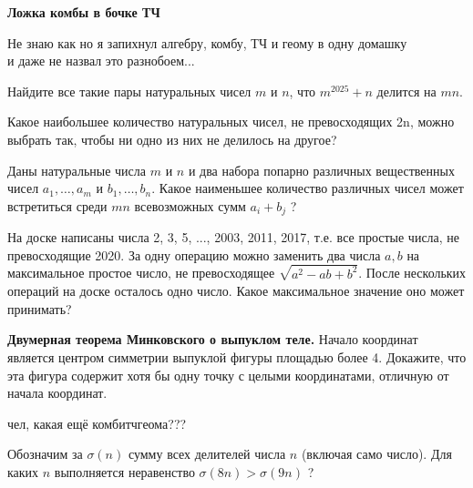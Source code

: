 \centerline{\bf \Huge Ложка комбы в бочке ТЧ}

\begin{flushright}
        \scriptsize{Не знаю как но я запихнул алгебру, комбу, ТЧ и геому в одну домашку\\ и даже не назвал это разнобоем...}
\end{flushright}

Найдите все такие пары натуральных чисел $m$ и $n$, что $m^{2025}+n$ делится на $m n$.

Какое наибольшее количество натуральных чисел, не превосходящих 2n, можно
выбрать так, чтобы ни одно из них не делилось на другое?


Даны натуральные числа $m$ и $n$ и два набора попарно различных вещественных чисел $a_1, \ldots, a_m$ и $b_1, \ldots, b_n$. Какое наименьшее количество различных чисел может встретиться среди $m n$ всевозможных сумм $a_i+b_j$ ?

На доске написаны числа 2, 3, 5, ..., 2003, 2011, 2017, т.е. все простые числа, не превосходящие 2020. За одну операцию можно заменить два числа $a, b$ на максимальное простое число, не превосходящее $\sqrt{a^2-a b+b^2}$. После нескольких операций на доске осталось одно число. Какое максимальное значение оно может принимать?


\textbf{Двумерная теорема Минковского о выпуклом теле.} Начало координат является центром симметрии выпуклой фигуры площадью более 4. Докажите, что эта фигура содержит хотя бы одну точку с целыми координатами, отличную от начала координат.

\begin{flushright}
        \vspace{-5mm}
        \scriptsize{чел, какая ещё комбитчгеома???}
\end{flushright}

Обозначим за $\sigma(n)$ сумму всех делителей числа $n$ (включая само число). Для каких $n$ выполняется неравенство $\sigma(8 n)>\sigma(9 n)$ ?